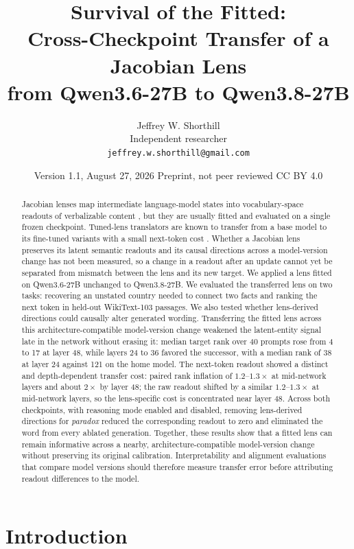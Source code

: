 \documentclass[10pt,a4paper,twocolumn]{article}
\title{Survival of the Fitted:\\
Cross-Checkpoint Transfer of a Jacobian Lens\\
from Qwen3.6-27B to Qwen3.8-27B}
\author{Jeffrey W. Shorthill\\
\small Independent researcher\\
\small \texttt{jeffrey.w.shorthill@gmail.com}}
\date{\small Version 1.1, August 27, 2026 \quad \textperiodcentered \quad
Preprint, not peer reviewed \quad \textperiodcentered \quad CC BY 4.0}
\begin{document}
\maketitle

\begin{abstract}
Jacobian lenses map intermediate language-model states into vocabulary-space
readouts of verbalizable content \citep{gurnee2026workspace}, but they are
usually fitted and evaluated on a single frozen checkpoint. Tuned-lens translators are known to transfer from a base model to its fine-tuned variants with a small next-token cost \citep{belrose2023tuned}. Whether a Jacobian lens preserves its latent semantic readouts and its causal directions across a model-version change has not been measured, so a change in a readout after an update cannot yet be separated from mismatch between the lens and its new target. We applied a lens fitted on Qwen3.6-27B unchanged to
Qwen3.8-27B. We evaluated the transferred lens on two tasks: recovering an
unstated country needed to connect two facts and ranking the next token in
held-out WikiText-103 passages. We also tested whether lens-derived directions
could causally alter generated wording. Transferring the fitted lens across this architecture-compatible model-version change weakened the latent-entity signal late in the network without erasing it: median target rank over 40 prompts rose from 4 to 17 at layer 48, while layers 24 to 36 favored the successor, with a median rank of 38 at layer 24 against 121 on the home model. The next-token readout showed a distinct and depth-dependent transfer cost: paired rank inflation of $1.2$--$1.3\times$ at mid-network layers and about $2\times$ by layer 48; the raw readout shifted by a similar $1.2$--$1.3\times$ at mid-network layers, so the lens-specific cost is concentrated near layer 48. Across both checkpoints, with reasoning mode enabled and disabled, removing lens-derived
directions for \emph{paradox} reduced the corresponding readout to zero and
eliminated the word from every ablated generation. Together, these results
show that a fitted lens can remain informative across a nearby, architecture-compatible model-version change without preserving its original calibration. Interpretability and alignment evaluations that compare model
versions should therefore measure transfer error before attributing readout
differences to the model.
\end{abstract}

\section{Introduction}
\end{document}
